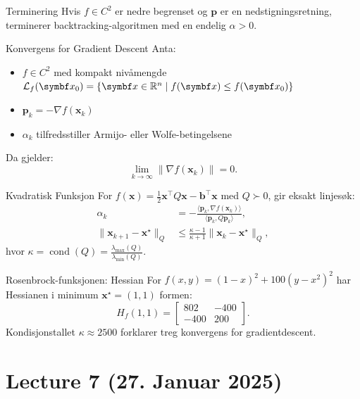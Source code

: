 \begin{lemma}{Terminering}{}
  Hvis \( f \in C^2 \) er nedre begrenset og \( \bm{p} \) er en nedstigningsretning, terminerer backtracking-algoritmen med en endelig \( \alpha > 0 \).
\end{lemma}

\begin{theorem}{Konvergens for Gradient Descent}{}
  Anta:
  \begin{itemize}
    \item \( f \in C^2 \) med kompakt nivåmengde \( \mathcal{L}_f(\bm{x}_0) = \{\bm{x} \in \R^n \mid f(\bm{x}) \leq f(\bm{x}_0)\} \)
    \item \( \bm{p}_k = -\nabla f(\bm{x}_k) \)
    \item \( \alpha_k \) tilfredsstiller Armijo- eller Wolfe-betingelsene
  \end{itemize}
  Da gjelder:
  \[
    \lim_{k \to \infty} \|\nabla f(\bm{x}_k)\| = 0.
  \]
\end{theorem}

\begin{example}{Kvadratisk Funksjon}{}
  For \( f(\bm{x}) = \frac{1}{2} \bm{x}^\top Q \bm{x} - \bm{b}^\top \bm{x} \) med \( Q \succ 0 \), gir eksakt linjesøk:
  \begin{align*}
    \alpha_k                          & = -\frac{\langle \bm{p}_k, \nabla f(\bm{x}_k) \rangle}{\langle \bm{p}_k, Q \bm{p}_k \rangle}, \\
    \|\bm{x}_{k+1} - \bm{x}^\star\|_Q & \leq \frac{\kappa - 1}{\kappa + 1} \|\bm{x}_k - \bm{x}^\star\|_Q,
  \end{align*}
  hvor \( \kappa = \operatorname{cond}(Q) = \frac{\lambda_{\max}(Q)}{\lambda_{\min}(Q)} \).
\end{example}

\begin{example}{Rosenbrock-funksjonen: Hessian}{}
  For \( f(x,y) = (1 - x)^2 + 100(y - x^2)^2 \) har Hessianen i minimum \( \bm{x}^\star = (1,1) \) formen:
  \[
    H_f(1,1) = \begin{bmatrix} 802 & -400 \\ -400 & 200 \end{bmatrix}.
  \]
  Kondisjonstallet \( \kappa \approx 2500 \) forklarer treg konvergens for gradientdescent.
\end{example}


\section{Lecture 7 (27. Januar 2025)}

